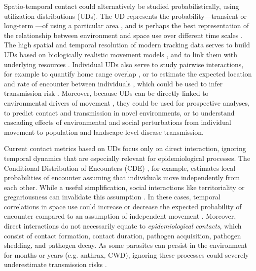 \documentclass[letterpaper]{article}
\begin{document}
Spatio-temporal contact could alternatively be studied probabilistically, using utilization distributions (UDs). The UD represents the probability---transient or long-term \citep{Tao2016}---of using a particular area \citep{Worton1989}, and is perhaps the best representation of the relationship between environment and space use over different time scales \citet{Webber2023}. The high spatial and temporal resolution of modern tracking data serves to build UDs based on biologically realistic movement models \citep{Kranstauber2012,Fleming2014}, and to link them with underlying resources \citep{Potts2023}.
Individual UDs also serve to study pairwise interactions, for example to quantify home range overlap \citep{Winner2018}, or to estimate the expected location and rate of encounter between individuals \citep{Noonan2021}, which could be used to infer transmission risk \citep{Godfrey2010, Godfrey2013,Noonan2021}. 
Moreover, because UDs can be directly linked to environmental drivers of movement \citep{Signer2017}, they could be used for prospective analyses, to predict contact and transmission in novel environments, or to understand cascading effects of environmental and social perturbations from individual movement to population and landscape-level disease transmission. 

Current contact metrics based on UDs focus only on direct interaction, ignoring temporal dynamics that are especially relevant for epidemiological processes. The Conditional Distribution of Encounters (CDE) \citep{Noonan2021}, for example, estimates local probabilities of encounter assuming that individuals move independently from each other.
While a useful simplification, social interactions like territoriality or gregariousness can invalidate this assumption \citep{Manlove2018,Sah2018}. In these cases, temporal correlations in space use could increase or decrease the expected probability of encounter compared to an assumption of independent movement \citep{Kjaer2008,Schauber2015a}. 
Moreover, direct interactions do not necessarily equate to \emph{epidemiological contacts}, which consist of contact formation, contact duration, pathogen acquisition, pathogen shedding, and pathogen decay. As some parasites can persist in the environment for months or years (e.g. anthrax, CWD), ignoring these processes could severely underestimate transmission risks  \citep{Wilber2022,Yang2023,Richardson2015}.
\end{document}
